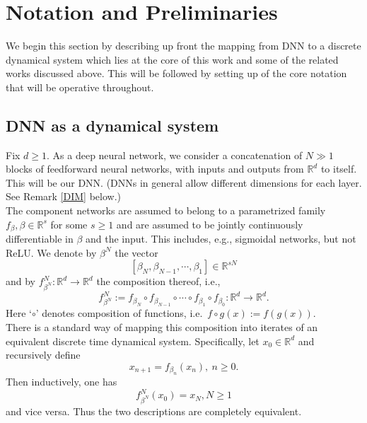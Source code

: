 \documentclass[12pt]{amsart}
\theoremstyle{plain}
\theoremstyle{definition}
\theoremstyle{remark}
\newcommand{\R}{\mathbb{R}}
\newcommand{\0}{\textbf{0}}
\begin{document}
\section{Notation and Preliminaries}\label{notation}

We begin this section by describing up front the mapping from DNN to a discrete dynamical system which lies at the core of this work and some of the related works discussed above. This will be followed by setting up of the core notation that will be operative throughout. \\

\subsection{DNN as a dynamical system}

Fix $d \geq 1$. As a deep neural network, we consider a concatenation of $N \gg 1$ blocks of feedforward neural networks, with inputs and outputs from $\R^d$ to itself. This will be our DNN. (DNNs in general allow different dimensions for each layer. See Remark \ref{DIM} below.) \\


The component networks are assumed to belong to a parametrized family $f_\beta, \beta \in \R^s$ for some $s \geq 1$ and are assumed to be jointly continuously differentiable in $\beta$ and the input. This includes, e.g., sigmoidal networks, but not ReLU. We denote by $\beta^N$ the vector 
$$[\beta_N, \beta_{N-1}, \cdots , \beta_1] \in \R^{sN}$$
and by $f^N_{\beta^N} : \R^d \to \R^d$ the composition thereof, i.e.,
\begin{equation}
f^N_{\beta^N} := f_{\beta_N}\circ f_{\beta_{N-1}} \circ \cdots \circ f_{\beta_1} \circ f_{\beta_0} : \R^d \to \R^d. \label{DNNmap}
\end{equation}
Here `$\circ$' denotes composition of functions, i.e.\ $f\circ g(x) := f(g(x))$. \\

There is a standard way of mapping this composition into iterates of an equivalent discrete time dynamical system. Specifically, let $x_0 \in \R^d$ and recursively define 
\begin{equation}
x_{n+1} = f_{\beta_n}(x_n), \ n \geq 0. \label{dynamics0}
\end{equation}
Then inductively, one has
$$f^N_{\beta^N}(x_0) = x_N, N \geq 1$$
and vice versa. Thus the two descriptions are completely equivalent.\\
\end{document}
